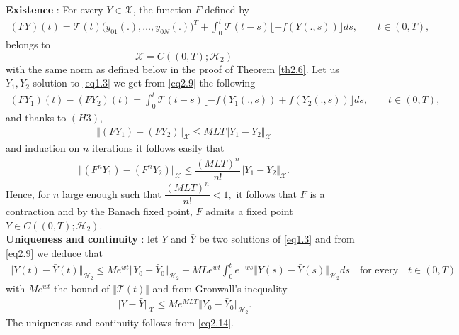 \documentclass[10pt, a4paper]{amsart}
\makeatletter
\theoremstyle{plain}
\theoremstyle{definition}
\theoremstyle{remark}
\renewenvironment{proof}[1][\proofname]{\par
  \pushQED{\qed}%
  \normalfont \topsep6\p@\@plus6\p@\relax
  \trivlist
  \item[\hskip\labelsep
        \itshape
    #1\ \ref{#1}.]\ignorespaces
}{%
  \popQED\endtrivlist\@endpefalse
}
\numberwithin{equation}{section}
\makeatother
\begin{document}
    \begin{proof}[of Theorem \ref{th2.5}]%
{\bf Existence} :    For every $Y\in \mathcal{X}$, the function  $F$ defined by 
\begin{align}\label{eq2.9}
(FY)(t)=\mathcal{T}(t)\bigl(y_{01}(.),\dots,y_{0N}(.)\bigr)^T+\displaystyle\int_0^t\mathcal{T}(t-s)\lfloor -f(Y(.,s))\rfloor ds,\qquad t\in (0,T),
\end{align}
belongs to $$\mathcal{X}=C((0,T);\mathcal{H}_2)$$ with the same norm as defined below in the proof of Theorem \ref{th2.6}. Let us $Y_1,Y_2$ solution to \eqref{eq1.3} we get from \eqref{eq2.9} the  following  
\begin{align}
(FY_1)(t)-(FY_2)(t)=\displaystyle\int_0^t\mathcal{T}(t-s)\lfloor -f(Y_1(.,s))+f(Y_2(.,s))\rfloor ds,\qquad t\in (0,T),
\end{align}
and thanks to $(H3),$
\begin{align}
\Vert (FY_1)-(FY_2)\Vert_{\mathcal{X}}\leq MLT\Vert Y_1-Y_2\Vert_{\mathcal{X}}
\end{align}
and induction on $n$ iterations  it follows easily that 
\begin{align}
\Vert (F^nY_1)-(F^nY_2)\Vert_{\mathcal{X}}\leq\dfrac{( MLT)^n}{n!}\Vert Y_1-Y_2\Vert_{\mathcal{X}}.
\end{align}
Hence, for $n$ large enough such that $\dfrac{( MLT)^n}{n!}<1,$ it follows that   $F$ is a contraction and  by the Banach fixed point, $F$ admits a fixed point $Y\in C((0,T) ; \mathcal{H}_2).$ 
\\{\bf Uniqueness and continuity} : let $Y$ and $\bar{Y}$ be two solutions of \eqref{eq1.3} and from \eqref{eq2.9} we deduce that
\begin{align}
    \Vert Y(t)-\bar{Y}(t)\Vert_{\mathcal{H}_2}\leq Me^{wt}\Vert Y_0-\bar{Y}_0\Vert_{\mathcal{H}_2}+MLe^{wt}\displaystyle\int_0^t e^{-ws}\Vert Y(s)-\bar{Y}(s)\Vert_{\mathcal{H}_2}ds\quad\text{for every}\quad t\in (0,T)
\end{align}
with $Me^{wt}$ the bound of $\Vert\mathcal{T}(t)\Vert$ and from Gronwall's inequality 
\begin{align}\label{eq2.14}
    \Vert Y-\bar{Y}\Vert_{\mathcal{X}}\leq Me^{MLT}\Vert Y_0-\bar{Y}_0\Vert_{\mathcal{H}_2}.
\end{align}
The uniqueness and continuity follows from \eqref{eq2.14}.
\end{proof}
\end{document}
